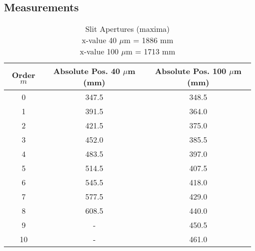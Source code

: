 \begin{appendix}
	\section{Measurements}
	\label{sec:Measurements}
	\begin{table}[H]
		\centering
		\begin{tabular}{c|c|c}
			Order $m$ & Absolute Pos. 40 $\mu$m (mm) & Absolute Pos. 100 $\mu$m (mm) \\
			\hline\hline
			0 & 347.5 & 348.5 \\ \hline
			1 & 391.5 & 364.0 \\ \hline
			2 & 421.5 & 375.0 \\ \hline
			3 & 452.0 & 385.5 \\ \hline
			4 & 483.5 & 397.0 \\ \hline
			5 & 514.5 & 407.5 \\ \hline
			6 & 545.5 & 418.0 \\ \hline
			7 & 577.5 & 429.0 \\ \hline
			8 & 608.5 & 440.0 \\ \hline
			9 & - & 450.5 \\ \hline
			10 & - & 461.0 \\ \hline
		\end{tabular}
		\caption{Slit Apertures (maxima)\\x-value 40 $\mu$m = 1886 mm\\ x-value 100 $\mu$m = 1713 mm}
		\label{tab:Slit_Measurements}
	\end{table}


\end{appendix}
